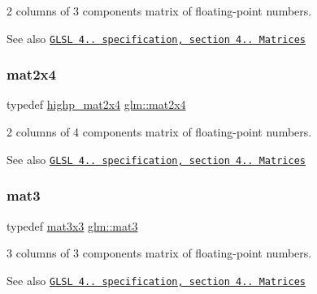 2 columns of 3 components matrix of floating-\/point numbers.

\begin{DoxySeeAlso}{See also}
\href{http://www.opengl.org/registry/doc/GLSLangSpec.4.20.8.pdf}{\tt G\+L\+SL 4.. specification, section 4.. Matrices} 
\end{DoxySeeAlso}
\mbox{\label{group__core__types_gaa9bfb36efaf88ecad32369ec8a01d901}} 
\subsubsection{\texorpdfstring{mat2x4}{mat2x4}}
{\footnotesize\ttfamily typedef \hyperlink{group__core__precision_ga4ad5980b248b3d4dcf014db8fa4495cf}{highp\+\_\+mat2x4} \hyperlink{group__core__types_gaa9bfb36efaf88ecad32369ec8a01d901}{glm\+::mat2x4}}

2 columns of 4 components matrix of floating-\/point numbers.

\begin{DoxySeeAlso}{See also}
\href{http://www.opengl.org/registry/doc/GLSLangSpec.4.20.8.pdf}{\tt G\+L\+SL 4.. specification, section 4.. Matrices} 
\end{DoxySeeAlso}
\mbox{\label{group__core__types_gadfaff2a7dce5cbf4e77a47ecea42ac5b}} 
\subsubsection{\texorpdfstring{mat3}{mat3}}
{\footnotesize\ttfamily typedef \hyperlink{group__core__types_ga6fecca6a869070b6bf8acb44ce1c2af3}{mat3x3} \hyperlink{group__core__types_gadfaff2a7dce5cbf4e77a47ecea42ac5b}{glm\+::mat3}}

3 columns of 3 components matrix of floating-\/point numbers.

\begin{DoxySeeAlso}{See also}
\href{http://www.opengl.org/registry/doc/GLSLangSpec.4.20.8.pdf}{\tt G\+L\+SL 4.. specification, section 4.. Matrices} 
\end{DoxySeeAlso}
\mbox{\label{group__core__types_gad7476e0e866186f12ee87975c6b01552}} 
